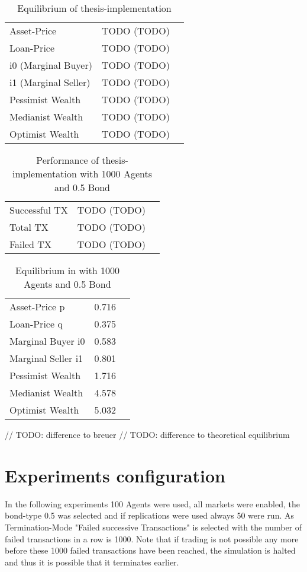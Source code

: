 \documentclass[Bachelorarbeit.tex]{subfiles}
\begin{document}
\begin{table}[h]
	\centering
	\caption{Equilibrium of thesis-implementation}
	\begin{tabular} { l c r }
		\hline
		Asset-Price & TODO (TODO) \\
		Loan-Price & TODO (TODO) \\
		i0 (Marginal Buyer) & TODO (TODO) \\
		i1 (Marginal Seller) & TODO (TODO) \\
		Pessimist Wealth & TODO (TODO) \\
		Medianist Wealth & TODO (TODO) \\
		Optimist Wealth & TODO (TODO) \\
		\hline
	\end{tabular}
\end{table}



\begin{table}[h]
	\centering
	\caption{Performance of thesis-implementation with 1000 Agents and 0.5 Bond}
	\begin{tabular} { l c r }
		\hline
		Successful TX & TODO (TODO) \\
		Total TX & TODO (TODO) \\
		Failed TX & TODO (TODO) \\
		\hline
	\end{tabular}
\end{table}

\begin{table}[h]
	\centering
	\caption{Equilibrium in \cite{Breuer2015} with 1000 Agents and 0.5 Bond }
	\begin{tabular} { l c r }
		\hline
		Asset-Price p & 0.716 \\
		Loan-Price q & 0.375 \\
		Marginal Buyer i0 & 0.583 \\
		Marginal Seller i1 & 0.801 \\
		Pessimist Wealth & 1.716 \\
		Medianist Wealth & 4.578 \\
		Optimist Wealth & 5.032 \\
		\hline
	\end{tabular}
\end{table}

// TODO: difference to breuer 
// TODO: difference to theoretical equilibrium

\section{Experiments configuration}
In the following experiments 100 Agents were used, all markets were enabled, the bond-type 0.5 was selected and if replications were used always 50 were run.
As Termination-Mode "Failed successive Transactions" is selected with the number of failed transactions in a row is 1000. Note that if trading is not possible any more before these 1000 failed transactions have been reached, the simulation is halted and thus it is possible that it terminates earlier.
\end{document}

